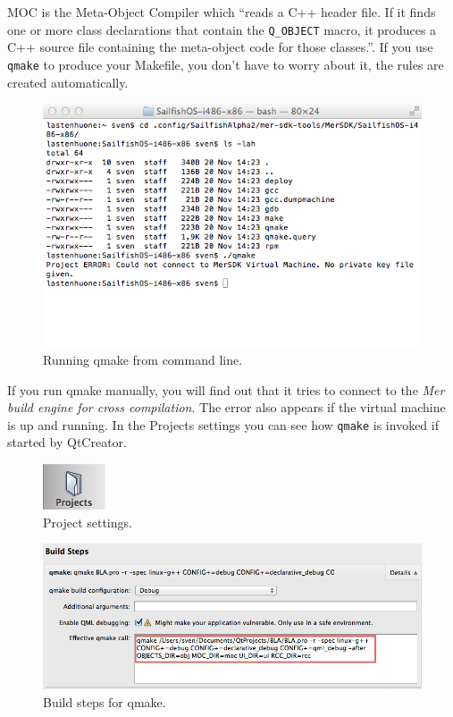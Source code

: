 MOC is the Meta-Object Compiler which ``reads a C++ header file. If it finds one or more class declarations that contain the \verb,Q_OBJECT, macro, it produces a C++ source file containing the meta-object code for those classes.''\cite{qt04}. If you use \verb,qmake, to produce your Makefile, you don't have to worry about it, the rules are created automatically.
%
\begin{figure}[H]
  \centering
  \includegraphics[scale=0.6]{../media/gfx/bash/qmake486.png} 
  \caption{Running qmake from command line.}
  \label{fig:qmake486commandline}
\end{figure}
%
If you run qmake manually, you will find out that it tries to connect to the \textit{Mer build engine for cross compilation}. The error also appears if the virtual machine is up and running. In the Projects settings you can see how \verb,qmake, is invoked if started by QtCreator.
%
\begin{figure}[H]
  \centering
  \includegraphics[scale=0.8]{../media/gfx/QtCreator/projects.png} 
  \caption{Project settings.}
  \label{fig:qmakeprojectsettings}
\end{figure}
%
%
\begin{figure}[H]
  \centering
  \includegraphics[scale=0.5]{../media/gfx/QtCreator/buildstepsqmake.png} 
  \caption{Build steps for qmake.}
  \label{fig:qmakebuildsteps}
\end{figure}
